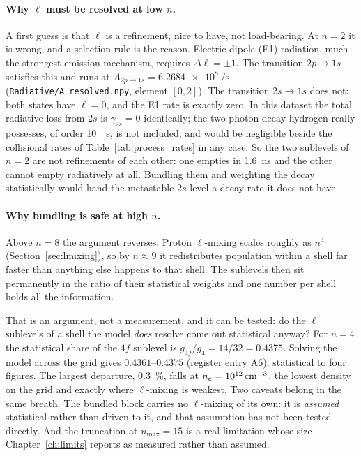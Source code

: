 \paragraph{Why $\ell$ must be resolved at low $n$.} A first guess is that
$\ell$ is a refinement, nice to have, not load-bearing. At $n=2$ it is wrong,
and a selection rule is the reason. Electric-dipole (E1) radiation, much the
strongest emission mechanism, requires $\Delta\ell = \pm1$. The transition
$2p \to 1s$ satisfies this and runs at
$A_{2p\to1s} = \SI{6.2684e8}{\per\second}$
(\texttt{Radiative/A\_resolved.npy}, element $[0,2]$). The transition
$2s \to 1s$ does not: both states have $\ell = 0$, and the E1 rate is exactly
zero. In this dataset the total radiative loss from $2s$ is $\gamma_{2s} = 0$
identically; the two-photon decay hydrogen really possesses, of order
\SI{10}{\per\second}, is not included, and would be negligible beside the
collisional rates of Table~\ref{tab:process_rates} in any case. So the two
sublevels of $n=2$ are not refinements of each other: one empties in
\SI{1.6}{\nano\second} and the other cannot empty radiatively at all. Bundling
them and weighting the decay statistically would hand the metastable $2s$ level
a decay rate it does not have.

\paragraph{Why bundling is safe at high $n$.} Above $n=8$ the argument reverses.
Proton $\ell$-mixing scales roughly as $n^{4}$ (Section~\ref{sec:lmixing}), so
by $n \approx 9$ it redistributes population within a shell far faster than
anything else happens to that shell. The sublevels then sit permanently in the
ratio of their statistical weights and one number per shell holds all the
information.

That is an argument, not a measurement, and it can be tested: do the $\ell$
sublevels of a shell the model \emph{does} resolve come out statistical anyway?
For $n=4$ the statistical share of the $4f$ sublevel is $g_{4f}/g_4 = 14/32 =
0.4375$. Solving the model across the grid gives $0.4361$--$0.4375$ (register
entry A6), statistical to four figures. The largest departure,
\SI{0.3}{\percent}, falls at $n_e = \SI{e12}{\per\cubic\centi\metre}$, the
lowest density on the grid and exactly where $\ell$-mixing is weakest. Two caveats
belong in the same breath. The bundled block carries no $\ell$-mixing of its own:
it is \emph{assumed} statistical rather than driven to it, and that assumption
has not been tested directly. And the truncation at $n_{\max} = 15$ is a real
limitation whose size Chapter~\ref{ch:limits} reports as measured rather than
assumed.

